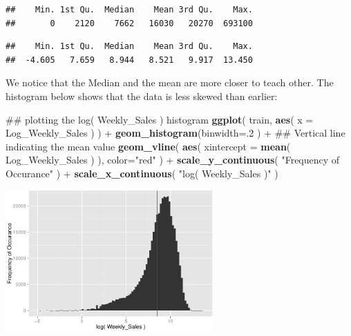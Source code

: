 \documentclass[]{article}
\newenvironment{Shaded}{\begin{snugshade}}{\end{snugshade}}
\newcommand{\KeywordTok}[1]{\textcolor[rgb]{0.13,0.29,0.53}{\textbf{{#1}}}}
\newcommand{\DataTypeTok}[1]{\textcolor[rgb]{0.13,0.29,0.53}{{#1}}}
\newcommand{\DecValTok}[1]{\textcolor[rgb]{0.00,0.00,0.81}{{#1}}}
\newcommand{\StringTok}[1]{\textcolor[rgb]{0.31,0.60,0.02}{{#1}}}
\newcommand{\NormalTok}[1]{{#1}}
\begin{document}
\begin{verbatim}
##    Min. 1st Qu.  Median    Mean 3rd Qu.    Max. 
##       0    2120    7662   16030   20270  693100
\end{verbatim}

\begin{Shaded}
\end{Shaded}

\begin{verbatim}
##    Min. 1st Qu.  Median    Mean 3rd Qu.    Max. 
##  -4.605   7.659   8.944   8.521   9.917  13.450
\end{verbatim}

We notice that the Median and the mean are more closer to teach other.
The histogram below shows that the data is less skewed than earlier:

\begin{Shaded}
\begin{Highlighting}[]
\NormalTok{## plotting the log( Weekly_Sales ) histogram}
\KeywordTok{ggplot}\NormalTok{( train, }\KeywordTok{aes}\NormalTok{( }\DataTypeTok{x =} \NormalTok{Log_Weekly_Sales ) ) +}
\StringTok{  }\KeywordTok{geom_histogram}\NormalTok{(}\DataTypeTok{binwidth=}\NormalTok{.}\DecValTok{2} \NormalTok{) +}\StringTok{ }
\StringTok{  }\NormalTok{## Vertical line indicating the mean value}
\StringTok{  }\KeywordTok{geom_vline}\NormalTok{( }\KeywordTok{aes}\NormalTok{( }\DataTypeTok{xintercept =} \KeywordTok{mean}\NormalTok{( Log_Weekly_Sales ) ), }\DataTypeTok{color=}\StringTok{"red"} \NormalTok{) +}
\StringTok{  }\KeywordTok{scale_y_continuous}\NormalTok{( }\StringTok{"Frequency of Occurance"} \NormalTok{) +}
\StringTok{  }\KeywordTok{scale_x_continuous}\NormalTok{( }\StringTok{"log( Weekly_Sales )"} \NormalTok{)}
\end{Highlighting}
\end{Shaded}

\includegraphics[width=300px]{PredictingWeeklySalesAtWalmart_files/figure-latex/logWeeklySalesHistogram-1}
\end{document}
